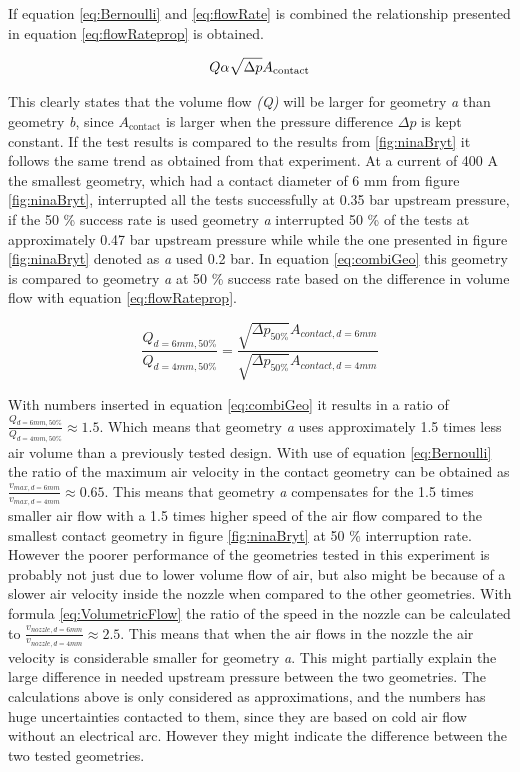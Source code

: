 \documentclass[10pt,a4paper]{article}
\begin{document}
If equation \eqref{eq:Bernoulli} and \eqref{eq:flowRate} is combined the relationship presented in equation \eqref{eq:flowRateprop} is obtained.

\begin{equation} \label{eq:flowRateprop}
Q \\ \alpha \\ \sqrt{\Delta p} A_\mathrm{{contact}}
\end{equation}

This clearly states that the volume flow \textit{(Q)} will be larger for geometry \textit{a} than geometry \textit{b}, since $A_\mathrm{{contact}}$ is larger when the pressure difference $\Delta p$ is kept constant. If the test results is compared to the results from \ref{fig:ninaBryt} it follows the same trend as obtained from that experiment. At a current of 400 A the smallest geometry, which had a contact diameter of 6 mm from figure \ref{fig:ninaBryt}, interrupted all the tests successfully at 0.35 bar upstream pressure, if the  50 \% success rate is used geometry \textit{a} interrupted 50 \% of the tests at approximately 0.47 bar upstream pressure while while the one presented in figure \ref{fig:ninaBryt} denoted as \textit{a} used 0.2 bar. In equation \eqref{eq:combiGeo} this geometry is  compared to geometry \textit{a} at 50 \% success rate based on the difference in volume flow with equation \eqref{eq:flowRateprop}.

\begin{equation} \label{eq:combiGeo}
\frac{Q_{d=6 mm, 50 \%}}{Q_{d=4 mm, 50 \%}}=\frac{\sqrt{\Delta p_{50 \%}} A_{contact, d=6 mm}}{\sqrt{\Delta p_{50 \%}} A_{contact, d=4 mm}}
\end{equation}

With numbers inserted in equation \eqref{eq:combiGeo} it results in a ratio of $\frac{Q_{d=6 mm, 50 \%}}{Q_{d=4 mm, 50 \%}}\approx 1.5$. Which means that geometry \textit{a} uses approximately 1.5 times less air volume than a previously tested design. With use of equation \eqref{eq:Bernoulli} the ratio of the maximum air velocity in the contact geometry can be obtained as $\frac{v_{max, d=6 mm}}{v_{max, d=4 mm}}\approx 0.65$. This means that geometry \textit{a} compensates for the 1.5 times smaller air flow with a 1.5 times higher speed of the air flow compared to the smallest contact geometry in figure \ref{fig:ninaBryt} at 50 \% interruption rate. However the poorer performance of the geometries tested in this experiment is probably not just due to lower volume flow of air, but also might be because of a slower air velocity inside the nozzle when compared to the other geometries. With formula \eqref{eq:VolumetricFlow} the ratio of the speed in the nozzle can be calculated to $\frac{v_{nozzle, d=6 mm}}{v_{nozzle, d=4 mm}}\approx 2.5$. This means that when the air flows in the nozzle the air velocity is considerable smaller for geometry \textit{a}. This might partially explain the large difference in needed upstream pressure between the two geometries. The calculations above is only considered as approximations, and the numbers has huge uncertainties contacted to them, since they are based on cold air flow without an electrical arc. However they might indicate the difference between the two tested geometries.
\end{document}
